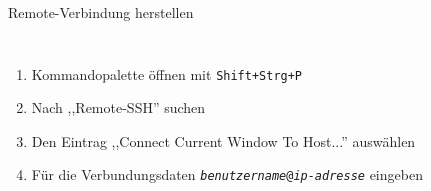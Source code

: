 
{
\scriptsize
\setlength{\fboxsep}{0pt}

\begin{frame}{Remote-Verbindung herstellen}
    \begin{columns}




        \begin{enumerate}
            \item Kommandopalette öffnen mit \texttt{Shift+Strg+P}
            \item Nach ,,Remote-SSH'' suchen
            \item Den Eintrag ,,Connect Current Window To Host...'' auswählen
            \item Für die Verbundungsdaten \texttt{\textit{benutzername}@\textit{ip-adresse}} eingeben
        \end{enumerate}
    \end{columns}


\end{frame}}
